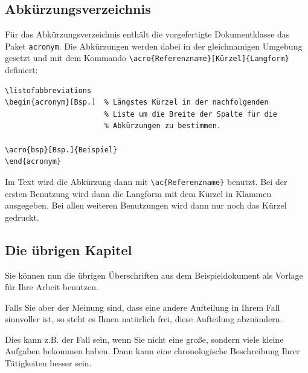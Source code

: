 \documentclass[pdftex,a4paper]{scrartcl}
\begin{document}



\subsection{Abkürzungsverzeichnis}
Für das Abkürzungsverzeichnis enthält die vorgefertigte Dokumentklasse das Paket
\verb+acronym+. Die Abkürzungen werden dabei in der gleichnamigen Umgebung gesetzt
und mit dem Kommando \verb+\acro{Referenzname}[Kürzel]{Langform}+ definiert:

\begin{verbatim}
\listofabbreviations
\begin{acronym}[Bsp.]  % Längstes Kürzel in der nachfolgenden
                       % Liste um die Breite der Spalte für die
                       % Abkürzungen zu bestimmen.

\acro{bsp}[Bsp.]{Beispiel}
\end{acronym}
\end{verbatim}

Im Text wird die Abkürzung dann mit \verb+\ac{Referenzname}+ benutzt.
Bei der ersten Benutzung wird dann die Langform mit dem Kürzel in Klammen
ausgegeben. Bei allen weiteren Benutzungen wird dann nur noch das Kürzel gedruckt.


\subsection{Die übrigen Kapitel}

Sie können nun die übrigen Überschriften aus dem Beispieldokument als Vorlage für Ihre Arbeit benutzen.

Falls Sie aber der Meinung sind, dass eine andere Aufteilung in Ihrem Fall sinnvoller ist, so steht es Ihnen natürlich frei, diese Aufteilung abzuändern.

Dies kann z.B. der Fall sein, wenn Sie nicht eine große, sondern viele kleine Aufgaben bekommen haben. Dann kann eine chronologische Beschreibung Ihrer Tätigkeiten besser sein.
\end{document}

